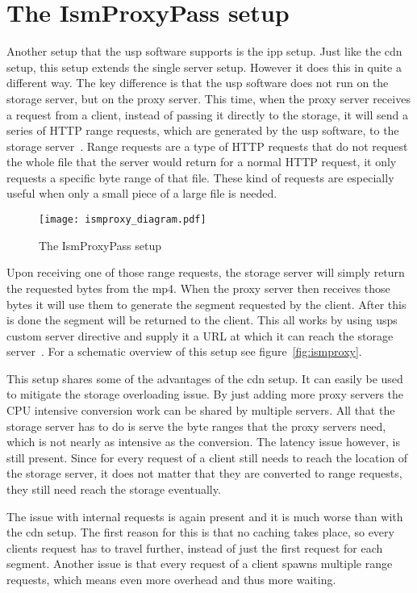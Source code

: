 \documentclass[twoside,openright]{uva-bachelor-thesis}
\begin{document}
\section{The IsmProxyPass setup}
Another setup that the \gls{usp} software supports is the \gls{ipp} setup. Just
like the \gls{cdn} setup, this setup extends the single server setup. However it
does this in quite a different way. The key difference is that the \gls{usp}
software does not run on the storage server, but on the proxy server. This
time, when the proxy server receives a request from a client, instead of passing
it directly to the storage, it will send a series of HTTP range requests, which
are generated by the \gls{usp} software, to the storage
server~\autocite{rangerequests}. Range requests are a type of HTTP requests that
do not request the whole file that the server would return for a normal HTTP
request, it only requests a specific byte range of that file.  These kind of
requests are especially useful when only a small piece of a large file is
needed.

\begin{figure}[h]
    \texttt{[image: ismproxy\_diagram.pdf]}
    \caption{The IsmProxyPass setup}\label{fig:ismproxy}
\end{figure}

Upon receiving one of those range requests, the storage server will simply
return the requested bytes from the mp4. When the proxy server then receives
those bytes it will use them to generate the segment requested by the client.
After this is done the segment will be returned to the client. This all works by
using \glspl{usp} custom \ipplong server directive and supply it a URL at
which it can reach the storage server~\autocites{uspismproxy}. For a schematic overview of this setup
see figure~\vref{fig:ismproxy}.

This setup shares some of the advantages of the \gls{cdn} setup. It can easily
be used to mitigate the storage overloading issue. By just adding more proxy
servers the CPU intensive conversion work can be shared by multiple servers. All
that the storage server has to do is serve the byte ranges that the proxy
servers need, which is not nearly as intensive as the conversion. The latency
issue however, is still present. Since for every request of a client still needs
to reach the location of the storage server, it does not matter that they are
converted to range requests, they still need reach the storage eventually.

The issue with internal requests is again present and it is much worse than with
the \gls{cdn} setup. The first reason for this is that no caching takes place,
so every clients request has to travel further, instead of just the first
request for each segment. Another issue is that every request of a client spawns
multiple range requests, which means even more overhead and thus more waiting.
\end{document}
